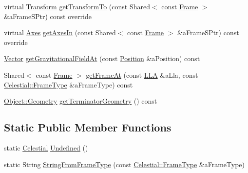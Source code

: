 \begin{DoxyCompactItemize}
\item 
virtual \hyperlink{classlibrary_1_1physics_1_1coord_1_1_transform}{Transform} \hyperlink{classlibrary_1_1physics_1_1env_1_1obj_1_1_celestial_ac6676b10ebbb63a8483137c9c734c58a}{get\+Transform\+To} (const Shared$<$ const \hyperlink{classlibrary_1_1physics_1_1coord_1_1_frame}{Frame} $>$ \&a\+Frame\+S\+Ptr) const override
\item 
virtual \hyperlink{classlibrary_1_1physics_1_1coord_1_1_axes}{Axes} \hyperlink{classlibrary_1_1physics_1_1env_1_1obj_1_1_celestial_a51d7ed3c0dcf627fbbcd81f9b190fb6b}{get\+Axes\+In} (const Shared$<$ const \hyperlink{classlibrary_1_1physics_1_1coord_1_1_frame}{Frame} $>$ \&a\+Frame\+S\+Ptr) const override
\item 
\hyperlink{classlibrary_1_1physics_1_1data_1_1_vector}{Vector} \hyperlink{classlibrary_1_1physics_1_1env_1_1obj_1_1_celestial_aa6313086a85ad19128d16f376a32aefe}{get\+Gravitational\+Field\+At} (const \hyperlink{classlibrary_1_1physics_1_1coord_1_1_position}{Position} \&a\+Position) const
\item 
Shared$<$ const \hyperlink{classlibrary_1_1physics_1_1coord_1_1_frame}{Frame} $>$ \hyperlink{classlibrary_1_1physics_1_1env_1_1obj_1_1_celestial_ad1dfffd88b216eccf83a9441cae304be}{get\+Frame\+At} (const \hyperlink{classlibrary_1_1physics_1_1coord_1_1spherical_1_1_l_l_a}{L\+LA} \&a\+Lla, const \hyperlink{classlibrary_1_1physics_1_1env_1_1obj_1_1_celestial_a8585fb32125cb6c73ae1339a5ea09c79}{Celestial\+::\+Frame\+Type} \&a\+Frame\+Type) const
\item 
\hyperlink{classlibrary_1_1physics_1_1env_1_1_object_abdf50733c7ad97327fb64edca5670f13}{Object\+::\+Geometry} \hyperlink{classlibrary_1_1physics_1_1env_1_1obj_1_1_celestial_aa910ed14605693ee5af68d88015cd53b}{get\+Terminator\+Geometry} () const
\end{DoxyCompactItemize}
\subsection*{Static Public Member Functions}
\begin{DoxyCompactItemize}
\item 
static \hyperlink{classlibrary_1_1physics_1_1env_1_1obj_1_1_celestial}{Celestial} \hyperlink{classlibrary_1_1physics_1_1env_1_1obj_1_1_celestial_a5e33230d05d77f5e1132151ecf5e94e9}{Undefined} ()
\item 
static String \hyperlink{classlibrary_1_1physics_1_1env_1_1obj_1_1_celestial_a020864aa551a1ec6f5674cc2e166b131}{String\+From\+Frame\+Type} (const \hyperlink{classlibrary_1_1physics_1_1env_1_1obj_1_1_celestial_a8585fb32125cb6c73ae1339a5ea09c79}{Celestial\+::\+Frame\+Type} \&a\+Frame\+Type)
\end{DoxyCompactItemize}


